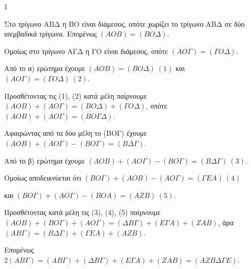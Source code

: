 \begin{ylh}{1}
    \item [ΛΥΣΗ]
    \begin{alist}
        \item Στο τρίγωνο ΑΒΔ η ΒΟ είναι διάμεσος, οπότε χωρίζει το τρίγωνο ΑΒΔ σε δύο ισεμβαδικά τρίγωνα. Επομένως $(ΑΟΒ) = (ΒΟΔ)$.
        \par Ομοίως στο τρίγωνο ΑΓΔ η ΓΟ είναι διάμεσος, οπότε $(ΑΟΓ) = (ΓΟΔ)$.
        
        \item Από το α) ερώτημα έχουμε $(ΑΟΒ) = (ΒΟΔ) \ (1)$ και $(ΑΟΓ) = (ΓΟΔ) \ (2)$.
        \par Προσθέτοντας τις (1), (2) κατά μέλη παίρνουμε $(ΑΟΒ) + (ΑΟΓ) = (ΒΟΔ) + (ΓΟΔ)$, οπότε $(ΑΟΒ) + (ΑΟΓ) = (ΒΟΓΔ)$.
        \par Αφαιρώντας από τα δύο μέλη το (ΒΟΓ) έχουμε $(ΑΟΒ) + (ΑΟΓ) - (ΒΟΓ) = (ΒΔΓ)$.
        
        \item Από το β) ερώτημα έχουμε $(ΑΟΒ) + (ΑΟΓ) - (ΒΟΓ) = (ΒΔΓ) \ (3)$.
        \par Ομοίως αποδεικνύεται ότι $(ΒΟΓ) + (ΑΟΒ) - (ΑΟΓ) = (ΓΕΑ) \ (4)$
        \par και $(ΒΟΓ) + (ΑΟΓ) - (ΒΟΑ) = (ΑΖΒ) \ (5)$.
        \par Προσθέτοντας κατά μέλη τις (3), (4), (5) παίρνουμε $(ΑΟΒ) + (ΒΟΓ) + (ΑΟΓ) = (ΔΒΓ) + (ΕΓΑ) + (ΖΑΒ)$, άρα $(ΑΒΓ) = (ΒΔΓ) + (ΓΕΑ) + (ΑΖΒ)$.
        \par Επομένως $2(ΑΒΓ)=(ΑΒΓ) + (ΔΒΓ) + (ΕΓΑ) + (ΖΑΒ) = (ΑΖΒΔΓΕ)$.
    \end{alist}
\end{ylh}